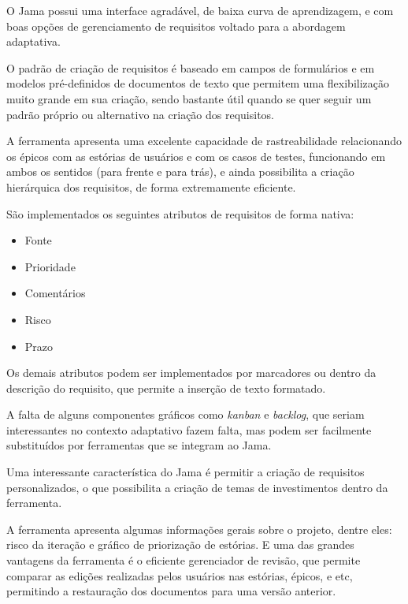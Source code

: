 O Jama possui uma interface agradável, de baixa curva de aprendizagem, e com boas opções de gerenciamento de requisitos voltado para a abordagem adaptativa.

O padrão de criação de requisitos é baseado em campos de formulários e em modelos pré-definidos de documentos de texto que permitem uma flexibilização muito grande em sua criação, sendo bastante útil quando se quer seguir um padrão próprio ou alternativo na criação dos requisitos.

A ferramenta apresenta uma excelente capacidade de rastreabilidade relacionando os épicos com as estórias de usuários e com os casos de testes, funcionando em ambos os sentidos (para frente e para trás), e ainda possibilita a criação hierárquica dos requisitos, de forma extremamente eficiente.

São implementados os seguintes atributos de requisitos de forma nativa:

\begin{itemize}
  \item Fonte
  \item Prioridade
  \item Comentários
  \item Risco
  \item Prazo
\end{itemize}

Os demais atributos podem ser implementados por marcadores ou dentro da descrição do requisito, que permite a inserção de texto formatado.

A falta de alguns componentes gráficos como \emph{kanban} e \emph{backlog}, que seriam interessantes no contexto adaptativo fazem falta, mas podem ser facilmente substituídos por ferramentas que se integram ao Jama.

Uma interessante característica do Jama é permitir a criação de requisitos personalizados, o que possibilita a criação de temas de investimentos dentro da ferramenta.

A ferramenta apresenta algumas informações gerais sobre o projeto, dentre eles: risco da iteração e gráfico de priorização de estórias. E uma das grandes vantagens da ferramenta é o eficiente gerenciador de revisão, que permite comparar as edições realizadas pelos usuários nas estórias, épicos, e etc, permitindo a restauração dos documentos para uma versão anterior.

